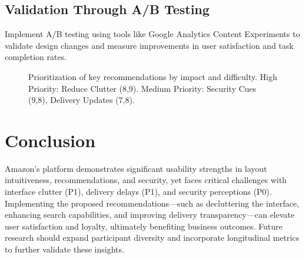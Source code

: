 \documentclass[conference]{IEEEtran}
\begin{document}
\subsection{Validation Through A/B Testing}
Implement A/B testing using tools like Google Analytics Content Experiments to validate design changes and measure improvements in user satisfaction and task completion rates.

\begin{figure}[!htbp]
\centering
{}
\caption{Prioritization of key recommendations by impact and difficulty. High Priority: Reduce Clutter (8,9). Medium Priority: Security Cues (9,8), Delivery Updates (7,8).}
\label{fig:priority_matrix}
\end{figure}

\section{Conclusion}
Amazon's platform demonstrates significant usability strengths in layout intuitiveness, recommendations, and security, yet faces critical challenges with interface clutter (P1), delivery delays (P1), and security perceptions (P0). Implementing the proposed recommendations—such as decluttering the interface, enhancing search capabilities, and improving delivery transparency—can elevate user satisfaction and loyalty, ultimately benefiting business outcomes. Future research should expand participant diversity and incorporate longitudinal metrics to further validate these insights.
\end{document}
